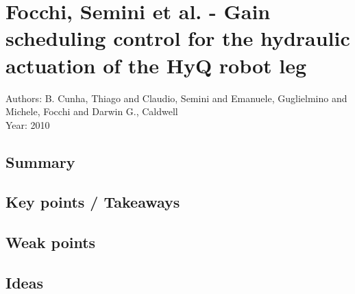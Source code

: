 \section{Focchi, Semini et al. - Gain scheduling control for the hydraulic actuation of the HyQ robot leg}
Authors: B. Cunha, Thiago and Claudio, Semini and Emanuele, Guglielmino and Michele, Focchi and Darwin G., Caldwell\\
Year: 2010
\subsection*{Summary}
\subsection*{Key points / Takeaways}
\subsection*{Weak points}
\subsection*{Ideas}